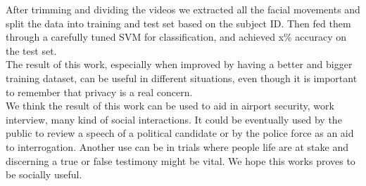After trimming and dividing the videos we extracted all the facial movements and split the data into training and test set based on the subject ID. Then fed them through a carefully tuned SVM for classification, and achieved x\% accuracy on the test set.\\
The result of this work, especially when improved by having a better and bigger training dataset, can be useful in different situations, even though it is important to remember that privacy is a real concern.\\
We think the result of this work can be used to aid in airport security, work interview, many kind of social interactions. It could be eventually used by the public to review a speech of a political candidate or by the police force as an aid to interrogation. Another use can be in trials where people life are at stake and discerning a true or false testimony might be vital. We hope this works proves to be socially useful.

\pagebreak

